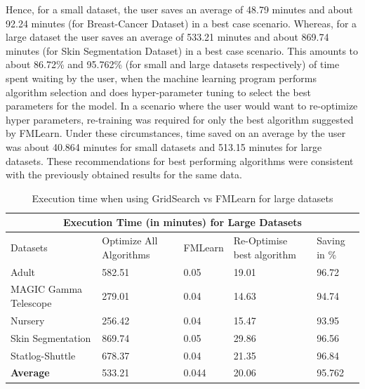 Hence, for a small dataset, the user saves an average of 48.79 minutes and about 92.24 minutes (for Breast-Cancer Dataset) in a best case scenario. Whereas, for a large dataset the user saves an average of 533.21 minutes and about 869.74 minutes (for Skin Segmentation Dataset) in a best case scenario. This amounts to about 86.72\% and 95.762\% (for small and large datasets respectively) of time spent waiting by the user, when the machine learning program performs algorithm selection and does hyper-parameter tuning to select the best parameters for the model. In a scenario where the user would want to re-optimize hyper parameters, re-training was required for only the best algorithm suggested by FMLearn. Under these circumstances, time saved on an average by the user was about 40.864 minutes for small datasets and 513.15 minutes for large datasets. These recommendations for best performing algorithms were consistent with the previously obtained results for the same data.

\begin{table}[H]
\centering 
\vspace*{+5pt}
 \begin{tabular}{ |p{1.8in}||p{1in}|p{0.7in}|p{1in}|p{0.8in}|  }
 \hline
 \multicolumn{5}{|c|}{Execution Time (in minutes) for Large Datasets} \\
 \hline
 Datasets & Optimize All Algorithms & FMLearn & Re-Optimise best algorithm & Saving in \%\\
 \hline
 Adult & 582.51 & 0.05 & 19.01 & 96.72 \\
 \hline
 MAGIC Gamma Telescope & 279.01 & 0.04 & 14.63 & 94.74 \\
  \hline
 Nursery & 256.42 &  0.04 & 15.47 & 93.95 \\
 \hline
 Skin Segmentation & 869.74 & 0.05 & 29.86 & 96.56 \\
 \hline
 Statlog-Shuttle & 678.37 & 0.04 & 21.35 & 96.84 \\
 \hline
 \hline
 \textbf{Average} & 533.21 & 0.044 & 20.06 & 95.762 \\
 \hline
\end{tabular}
\vspace*{+5pt}
\caption{Execution time when using GridSearch vs FMLearn for large datasets}
\label{table:2}
\end{table}
\vspace*{-10pt}

